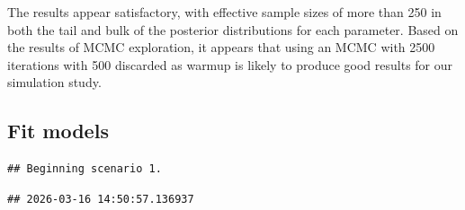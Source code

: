 \documentclass[
]{article}
\newenvironment{Shaded}{\begin{snugshade}}{\end{snugshade}}
\newcommand{\AttributeTok}[1]{\textcolor[rgb]{0.13,0.29,0.53}{#1}}
\newcommand{\ConstantTok}[1]{\textcolor[rgb]{0.56,0.35,0.01}{#1}}
\newcommand{\DecValTok}[1]{\textcolor[rgb]{0.00,0.00,0.81}{#1}}
\newcommand{\FunctionTok}[1]{\textcolor[rgb]{0.13,0.29,0.53}{\textbf{#1}}}
\newcommand{\NormalTok}[1]{#1}
\newcommand{\OtherTok}[1]{\textcolor[rgb]{0.56,0.35,0.01}{#1}}
\newcommand{\SpecialCharTok}[1]{\textcolor[rgb]{0.81,0.36,0.00}{\textbf{#1}}}
\newcommand{\StringTok}[1]{\textcolor[rgb]{0.31,0.60,0.02}{#1}}
\begin{document}
\linespread{1}

The results appear satisfactory, with effective sample sizes of more than 250 in both the tail and bulk of the posterior distributions for each parameter. Based on the results of MCMC exploration, it appears that using an MCMC with 2500 iterations with 500 discarded as warmup is likely to produce good results for our simulation study.

\subsection{Fit models}\label{fit-models}

\linespread{1}

\begin{Shaded}
\end{Shaded}

\begin{verbatim}
## Beginning scenario 1.
\end{verbatim}

\begin{verbatim}
## 2026-03-16 14:50:57.136937
\end{verbatim}
\end{document}
